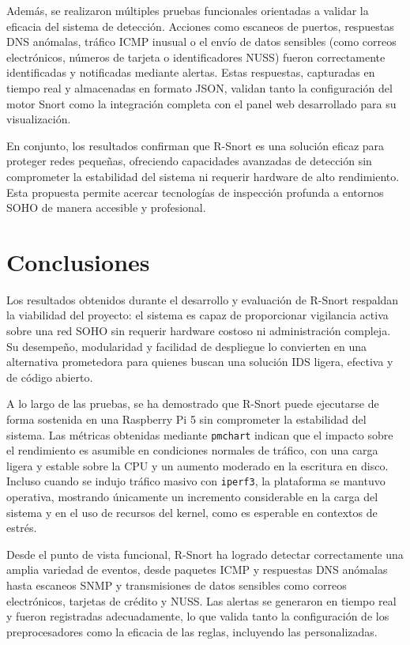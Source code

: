 \documentclass[11pt,a4paper,twoside]{report}
\begin{document}
Además, se realizaron múltiples pruebas funcionales orientadas a validar la eficacia del sistema de detección. Acciones como escaneos de puertos, respuestas DNS anómalas, tráfico ICMP inusual o el envío de datos sensibles (como correos electrónicos, números de tarjeta o identificadores NUSS) fueron correctamente identificadas y notificadas mediante alertas. Estas respuestas, capturadas en tiempo real y almacenadas en formato JSON, validan tanto la configuración del motor Snort como la integración completa con el panel web desarrollado para su visualización.\newline

En conjunto, los resultados confirman que R-Snort es una solución eficaz para proteger redes pequeñas, ofreciendo capacidades avanzadas de detección sin comprometer la estabilidad del sistema ni requerir hardware de alto rendimiento. Esta propuesta permite acercar tecnologías de inspección profunda a entornos SOHO de manera accesible y profesional.


\chapter*{Conclusiones}

Los resultados obtenidos durante el desarrollo y evaluación de R-Snort respaldan la viabilidad del proyecto: el sistema es capaz de proporcionar vigilancia activa sobre una red SOHO sin requerir hardware costoso ni administración compleja. Su desempeño, modularidad y facilidad de despliegue lo convierten en una alternativa prometedora para quienes buscan una solución IDS ligera, efectiva y de código abierto.\newline

A lo largo de las pruebas, se ha demostrado que R-Snort puede ejecutarse de forma sostenida en una Raspberry Pi 5 sin comprometer la estabilidad del sistema. Las métricas obtenidas mediante \texttt{pmchart} indican que el impacto sobre el rendimiento es asumible en condiciones normales de tráfico, con una carga ligera y estable sobre la CPU y un aumento moderado en la escritura en disco. Incluso cuando se indujo tráfico masivo con \texttt{iperf3}, la plataforma se mantuvo operativa, mostrando únicamente un incremento considerable en la carga del sistema y en el uso de recursos del kernel, como es esperable en contextos de estrés.\newline

Desde el punto de vista funcional, R-Snort ha logrado detectar correctamente una amplia variedad de eventos, desde paquetes ICMP y respuestas DNS anómalas hasta escaneos SNMP y transmisiones de datos sensibles como correos electrónicos, tarjetas de crédito y NUSS. Las alertas se generaron en tiempo real y fueron registradas adecuadamente, lo que valida tanto la configuración de los preprocesadores como la eficacia de las reglas, incluyendo las personalizadas.\newline
\end{document}
